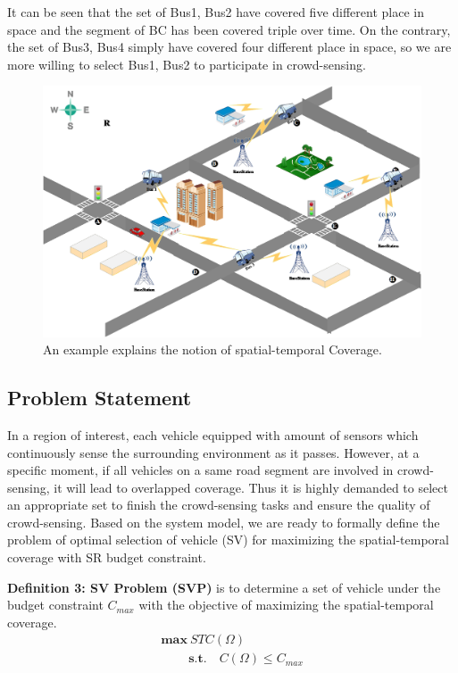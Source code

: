 \documentclass[journal]{IEEEtran}
\begin{document}
It can be seen that the set of {Bus1, Bus2} have covered five different place in space and the segment of {BC} has been covered triple over time. On the contrary, the set of {Bus3, Bus4} simply have covered four different place in space, so we are more willing to select {Bus1, Bus2} to participate in crowd-sensing.
\begin{figure}[t]
	\centering
	\includegraphics[width=1\linewidth]{Fig2.png}
	\caption{An example explains the notion of spatial-temporal Coverage.}
	\label{fig:figure4}
\end{figure}	
\subsection{Problem Statement} 
In a region of interest, each vehicle equipped with amount of sensors which continuously sense the surrounding environment as it passes. However, at a specific moment, if all vehicles on a same road segment are involved in crowd-sensing, it will lead to overlapped coverage. Thus it is highly demanded to select an appropriate set to finish the crowd-sensing tasks and ensure the quality of crowd-sensing. Based on the system model, we are ready to formally define the problem of optimal selection of vehicle (SV) for maximizing the spatial-temporal coverage with SR budget constraint.	

\noindent
\textbf{Definition 3: SV Problem (SVP)} is to determine a set of vehicle under the budget constraint $C_{max}$ with the objective of maximizing the spatial-temporal coverage.
\begin{equation}
\begin{matrix}
\textbf{max} \ STC(\Omega )\\\quad\quad\
\textbf{s.t.}\quad C(\Omega)\leqslant C_{max}\end{matrix}
\end{equation}
\end{document}
